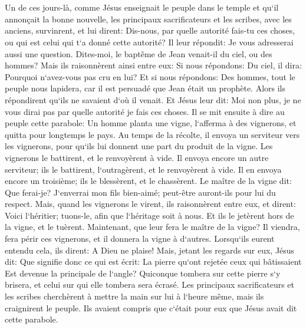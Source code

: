 \chapter{}

\verse Un de ces jours-là, comme Jésus enseignait le peuple dans le temple et qu`il annonçait la bonne nouvelle, les principaux sacrificateurs et les scribes, avec les anciens, survinrent, 
\verse et lui dirent: Dis-nous, par quelle autorité fais-tu ces choses, ou qui est celui qui t`a donné cette autorité? 
\verse Il leur répondit: Je vous adresserai aussi une question. 
\verse Dites-moi, le baptême de Jean venait-il du ciel, ou des hommes? 
\verse Mais ils raisonnèrent ainsi entre eux: Si nous répondons: Du ciel, il dira: Pourquoi n`avez-vous pas cru en lui? 
\verse Et si nous répondons: Des hommes, tout le peuple nous lapidera, car il est persuadé que Jean était un prophète. 
\verse Alors ils répondirent qu`ils ne savaient d`où il venait. 
\verse Et Jésus leur dit: Moi non plus, je ne vous dirai pas par quelle autorité je fais ces choses. 
\verse Il se mit ensuite à dire au peuple cette parabole: Un homme planta une vigne, l`afferma à des vignerons, et quitta pour longtemps le pays. 
\verse Au temps de la récolte, il envoya un serviteur vers les vignerons, pour qu`ils lui donnent une part du produit de la vigne. Les vignerons le battirent, et le renvoyèrent à vide. 
\verse Il envoya encore un autre serviteur; ils le battirent, l`outragèrent, et le renvoyèrent à vide. 
\verse Il en envoya encore un troisième; ils le blessèrent, et le chassèrent. 
\verse Le maître de la vigne dit: Que ferai-je? J`enverrai mon fils bien-aimé; peut-être auront-ils pour lui du respect. 
\verse Mais, quand les vignerons le virent, ils raisonnèrent entre eux, et dirent: Voici l`héritier; tuons-le, afin que l`héritage soit à nous. 
\verse Et ils le jetèrent hors de la vigne, et le tuèrent. Maintenant, que leur fera le maître de la vigne? 
\verse Il viendra, fera périr ces vignerons, et il donnera la vigne à d`autres. Lorsqu`ils eurent entendu cela, ils dirent: A Dieu ne plaise! 
\verse Mais, jetant les regards sur eux, Jésus dit: Que signifie donc ce qui est écrit: La pierre qu`ont rejetée ceux qui bâtissaient Est devenue la principale de l`angle? 
\verse Quiconque tombera sur cette pierre s`y brisera, et celui sur qui elle tombera sera écrasé. 
\verse Les principaux sacrificateurs et les scribes cherchèrent à mettre la main sur lui à l`heure même, mais ils craignirent le peuple. Ils avaient compris que c`était pour eux que Jésus avait dit cette parabole. 

